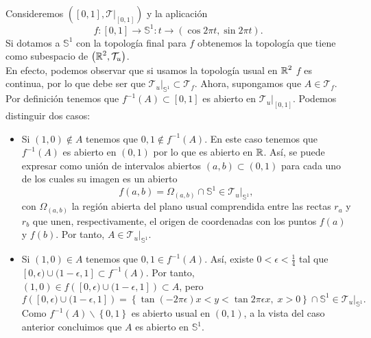 \begin{eg}
	Consideremos $\displaystyle \left(\left[0,1\right] , \mathcal{T}|_{\left[0,1\right] }\right) $ y la aplicación 
	\[f : \left[0,1\right] \to \mathbb{S}^{1} : t \to \left(\cos2\pi t, \sin2\pi t\right) .\]
	Si dotamos a $\displaystyle \mathbb{S}^{1} $ con la topología final para $\displaystyle f $ obtenemos la topología que tiene como subespacio de $\displaystyle \left(\mathbb{R}^{2}, \mathcal{T}_{u}\right) $. \\

	En efecto, podemos observar que si usamos la topología usual en $\displaystyle \mathbb{R}^{2} $ $\displaystyle f $ es continua, por lo que debe ser que $\displaystyle \mathcal{T}_{u} | _{\mathbb{S}^{1}}\subset \mathcal{T}_{f} $. Ahora, supongamos que $\displaystyle A \in \mathcal{T}_{f} $. Por definición tenemos que $\displaystyle f^{-1}\left(A\right)\subset\left[0,1\right]  $ es abierto en $\displaystyle \mathcal{T}_{u}|_{\left[0,1\right] } $. Podemos distinguir dos casos:
	\begin{itemize}
	\item Si $\displaystyle \left(1,0\right)\not\in A $ tenemos que $\displaystyle 0,1\not\in f^{-1}\left(A\right) $. En este caso tenemos que $\displaystyle f^{-1}\left(A\right) $ es abierto en $\displaystyle \left(0,1\right) $ por lo que es abierto en $\displaystyle \mathbb{R} $. Así, se puede expresar como unión de intervalos abiertos $\displaystyle \left(a,b\right)\subset \left(0,1\right) $ para cada uno de los cuales su imagen es un abierto
		\[f\left(a,b\right)=\Omega_{\left(a,b\right)}\cap \mathbb{S}^{1}\in \mathcal{T}_{u}|_{\mathbb{S}^{1}} ,\]
		con $\displaystyle \Omega_{\left(a,b\right)} $ la región abierta del plano usual comprendida entre las rectas $\displaystyle r_{a} $ y $\displaystyle r_{b} $ que unen, respectivamente, el origen de coordenadas con los puntos $\displaystyle f\left(a\right) $ y $\displaystyle f\left(b\right) $. Por tanto, $\displaystyle A \in \mathcal{T}_{u}|_{\mathbb{S}^{1}} $.
	\item Si $\displaystyle \left(1,0\right)\in A $ tenemos que $\displaystyle 0,1\in f^{-1}\left(A\right) $. Así, existe $\displaystyle 0 < \epsilon < \frac{1}{4} $ tal que $\displaystyle [0,\epsilon) \cup(1-\epsilon, 1 ] \subset f^{-1}\left(A\right) $. Por tanto, $\displaystyle \left(1,0\right)\in f\left([0,\epsilon) \cup(1-\epsilon,1]\right)\subset A $, pero 
		\[f\left([0,\epsilon)\cup(1-\epsilon,1]\right)= \left\{ \tan\left(-2\pi \epsilon \right)x < y < \tan 2\pi \epsilon x, \; x > 0\right\} \cap \mathbb{S}^{1} \in \mathcal{T}_{u} |_{\mathbb{S}^{1}} .\]
		Como $\displaystyle f^{-1}\left(A\right)\backslash \left\{ 0,1\right\}  $ es abierto usual en $\displaystyle \left(0,1\right) $, a la vista del caso anterior concluimos que $\displaystyle A $ es abierto en $\displaystyle \mathbb{S}^{1} $. 
	\end{itemize}
\end{eg}
